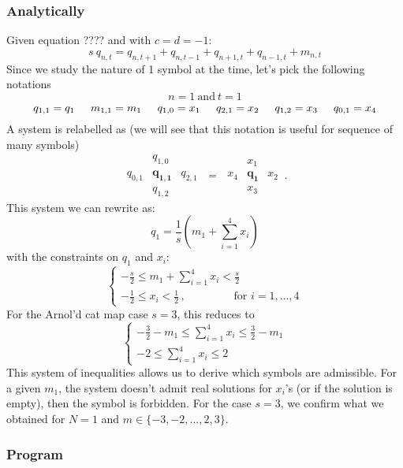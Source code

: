\subsubsection{Analytically}

Given equation ???? and with $c = d = -1$:
\[
 s \: q_{n,t} = q_{n,t+1} + q_{n,t-1} + q_{n+1,t} + q_{n-1,t} + m_{n,t}
\]
Since we study the nature of 1 symbol at the time, let's pick the following notations
\[
n = 1 \: \text{and} \: t = 1
\]
\[
q_{1,1} = q_1 \hskip 0.2in m_{1,1} = m_1 \hskip 0.2in q_{1,0} = x_1 \hskip 0.2in q_{2,1} = x_2 \hskip 0.2in q_{1,2} = x_3 \hskip 0.2in q_{0,1} = x_4
\]
A system is relabelled as (we will see that this
notation is useful for sequence of many symbols)
\[
\begin{array}{ccc}
\: & q_{1,0}& \: \\
q_{0,1}& \boldsymbol{q_{1,1}} & q_{2,1}\\
\: & q_{1,2}& \:
\end{array}
\;=\;
\begin{array}{ccc}
\: & x_1 & \: \\
x_4 & \boldsymbol{q_1} & x_2 \\
\: & x_3 & \:
\end{array}
\,.
\]
This system we can rewrite as:
\[
q_1 = \frac{1}{s} (m_1 + \sum_{i = 1} ^ {4} x_i)
\]
with the constraints on $q_1$ and $x_i$:
\[
\left\{
\begin {array} {l}
-\frac{s}{2} \leqslant m_1 +  \sum\limits_{i = 1} ^ {4} x_i < \frac{s}{2} \\
-\frac{1}{2} \leqslant x_i < \frac{1}{2}
\,,\qquad\qquad
\text{ for } i = 1, \dots, 4
\end {array}
\right.
\]
For the Arnol'd cat map case $s = 3$, this reduces to
\[
\left\{
\begin {array} {l}
-\frac{3}{2} - m_1 \leqslant \sum\limits_{i = 1} ^ {4} x_i \leqslant \frac{3}{2} - m_1\\
-2 \leqslant \sum\limits_{i = 1} ^ {4} x_i\leqslant 2
\end {array}
\right.
\]
This system of inequalities allows us to derive which symbols are
admissible. For a given $m_1$, the system doesn't admit real solutions for
$x_i$'s (or if the solution is empty), then the symbol is forbidden. For
the case $s = 3$, we confirm what we obtained for $N = 1$ and $m \in
\{-3, -2, \dots, 2, 3\}$.

\subsubsection{Program}

